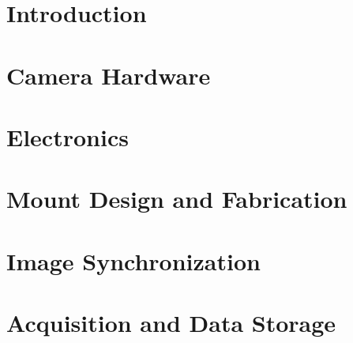 \documentclass{report}
\begin{document}
	
	\cleardoublepage
	\chapter*{Introduction}
	
	\cleardoublepage
	\tableofcontents
	\thispagestyle{empty}
	\cleardoublepage
	\setcounter{page}{1}
	

	\chapter{Camera Hardware}
	
	
	\chapter{Electronics}
	
	
	\chapter{Mount Design and Fabrication}		
	
	
	\chapter{Image Synchronization}\label{ch:sync}
	
	
	\chapter{Acquisition and Data Storage}
	
	
\end{document}
